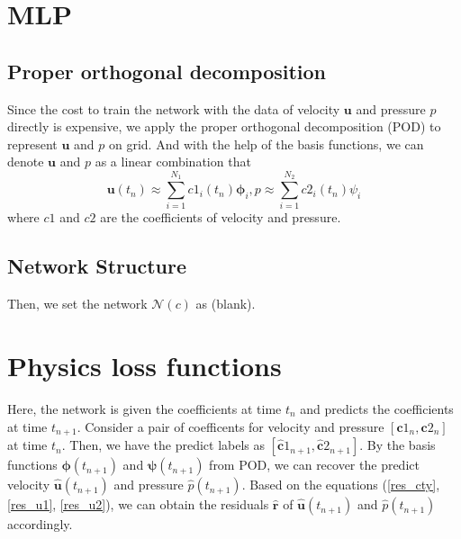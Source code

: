 \documentclass[12pt]{article} %
\newcommand{\bu}{\bm{u}}
\newcommand{\br}{\bm{r}}
\begin{document}
\section{MLP}
\subsection{Proper orthogonal decomposition}
Since the cost to train the network with the data of velocity $\bu$ and pressure $p$ directly is expensive, we apply the proper orthogonal decomposition (POD) to represent $\bu$ and $p$  on grid. And with the help of the basis functions, we can denote $\bu$ and $p$ as a linear combination that
\begin{equation}
    \bu(t_n) \approx \sum_{i=1}^{N_1} c1_i(t_n) \bm{\phi}_i, p\approx \sum_{i=1}^{N_2} c2_i(t_n) \psi_i
\end{equation}
where $c1$ and $c2$ are the coefficients of velocity and pressure.
\subsection{Network Structure}
Then, we set the network $\mathcal{N}(c)$ as (blank).
\section{Physics loss functions}
Here, the network is given the coefficients at time $t_n$ and predicts the coefficients at time $t_{n+1}$. Consider a pair of coefficents for velocity and pressure $[\bm{c}1_n, \bm{c}2_n]$ at time $t_n$.
Then, we have the predict labels as $[\bm{\hat{c}}1_{n+1}, \bm{\hat{c}}2_{n+1}]$. By the basis functions $\bm{\phi}(t_{n+1})$ and $\bm{\psi}(t_{n+1})$ from POD, we can recover the predict velocity  $\hat{\bm{u}}(t_{n+1})$ and pressure $\hat{p}(t_{n+1})$. Based on the equations (\ref{res_cty}, \ref{res_u1}, \ref{res_u2}), we can obtain the residuals $\hat{\br}$ of $\hat{\bm{u}}(t_{n+1})$ and $\hat{p}(t_{n+1})$ accordingly.








\end{document}
